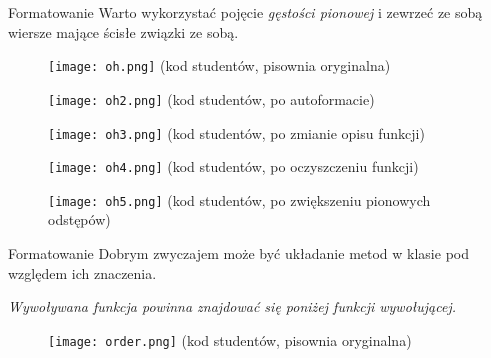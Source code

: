\begin{frame}{Formatowanie}
	Warto wykorzystać pojęcie \emph{gęstości pionowej} i zewrzeć ze sobą wiersze mające ścisłe związki ze sobą.
\end{frame}

\begin{frame}
	\begin{figure} \centering
		\texttt{[image: oh.png]}
		\footnotesize{(kod studentów, pisownia oryginalna)}
	\end{figure}
\end{frame}

\begin{frame}
	\begin{figure} \centering
		\texttt{[image: oh2.png]}
		\footnotesize{(kod studentów, po autoformacie)}
	\end{figure}
\end{frame}

\begin{frame}
	\begin{figure} \centering
		\texttt{[image: oh3.png]}
		\footnotesize{(kod studentów, po zmianie opisu funkcji)}
	\end{figure}
\end{frame}

\begin{frame}
	\begin{figure} \centering
		\texttt{[image: oh4.png]}
		\footnotesize{(kod studentów, po oczyszczeniu funkcji)}
	\end{figure}
\end{frame}

\begin{frame}
	\begin{figure} \centering
		\texttt{[image: oh5.png]}
		\footnotesize{(kod studentów, po zwiększeniu pionowych odstępów)}
	\end{figure}
\end{frame}

\begin{frame}{Formatowanie}
	Dobrym zwyczajem może być układanie metod w klasie pod względem ich znaczenia.
	
	\emph{Wywoływana funkcja powinna znajdować się poniżej funkcji wywołującej.}
\end{frame}

\begin{frame}
	\begin{figure} \centering
		\texttt{[image: order.png]}
		\footnotesize{(kod studentów, pisownia oryginalna)}
	\end{figure}
\end{frame}

